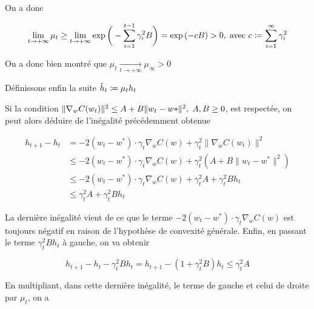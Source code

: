 \documentclass{article}
\begin{document}
On a donc

\begin{equation*}
    \lim_{t\to+\infty} \mu_t \geq \lim_{t\to+\infty} \exp{\bigg(- \sum_{i=1}^{t-1}{\gamma_i^{2}B}\bigg)} = \exp{(-cB)} > 0, \hspace{0.1cm} \text{avec } c \coloneqq \sum_{i=1}^{\infty} \gamma_i^{2} 
\end{equation*}
\bigskip

On a donc bien montré que $\mu_t \underset{t\to+\infty}{\longrightarrow} \mu_{\infty} > 0$
\bigskip


Définissons enfin la suite $\Tilde{h}_t \coloneqq \mu_t h_t$
\bigskip

Si la condition $\lVert \nabla_wC(w_t) \rVert^{2} \leq A + B \lVert w_t - w* \rVert^2, \hspace{0.1cm} A, B \geq 0$, est respectée, on peut alors déduire de l'inégalité précédemment obtenue

\begin{equation*}
    \begin{split}
        h_{t+1} - h_t & = -2(w_t - w^{*}) \cdot \gamma_t \nabla_wC(w) + \gamma_t^{2}\lVert \nabla_wC(w_t) \rVert^{2} \\
        & \leq -2(w_t - w^{*}) \cdot \gamma_t \nabla_wC(w) + \gamma_t^{2}(A + B \lVert w_t - w^{*} \rVert^{2}) \\
        & \leq -2(w_t - w^{*}) \cdot \gamma_t \nabla_wC(w) + \gamma_t^{2}A + \gamma_t^{2}B h_t \\
        & \leq \gamma_t^{2}A + \gamma_t^{2}B h_t
    \end{split}
\end{equation*}

La dernière inégalité vient de ce que le terme $-2(w_t - w^{*}) \cdot \gamma_t \nabla_wC(w)$ est toujours négatif en raison de l'hypothèse de convexité générale. Enfin, en passant le terme $\gamma_t^{2}B h_t$ à gauche, on va obtenir 

\begin{equation*}
        h_{t+1} - h_t - \gamma_t^{2}B h_t = h_{t+1} - (1 + \gamma_t^{2}B)h_t \leq \gamma_t^{2}A
\end{equation*}

En multipliant, dans cette dernière inégalité, le terme de gauche et celui de droite par $\mu_t$, on a
\end{document}
